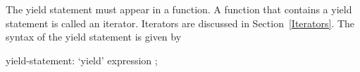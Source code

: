 The yield statement must appear in a function.  A function that
contains a yield statement is called an iterator.  Iterators are
discussed in Section~\ref{Iterators}.  The syntax of the yield
statement is given by
\begin{syntax}
yield-statement:
  `yield' expression ;
\end{syntax}
